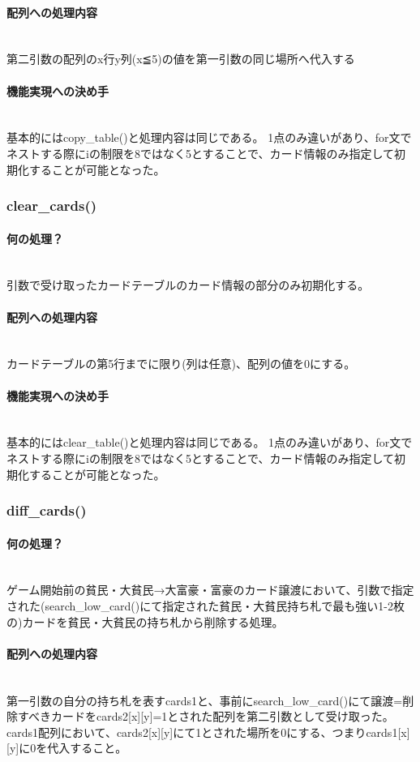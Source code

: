 \documentclass[11pt,a4paper, uplatex]{jsarticle}
\begin{document}
\paragraph{配列への処理内容}\mbox{}\\
第二引数の配列のx行y列(x≦5)の値を第一引数の同じ場所へ代入する
\paragraph{機能実現への決め手}\mbox{}\\
基本的にはcopy\_table()と処理内容は同じである。
1点のみ違いがあり、for文でネストする際にiの制限を8ではなく5とすることで、カード情報のみ指定して初期化することが可能となった。
%
\subsubsection{clear\_cards()}
\paragraph{何の処理？}\mbox{}\\
引数で受け取ったカードテーブルのカード情報の部分のみ初期化する。
\paragraph{配列への処理内容}\mbox{}\\
カードテーブルの第5行までに限り(列は任意)、配列の値を0にする。
\paragraph{機能実現への決め手}\mbox{}\\
基本的にはclear\_table()と処理内容は同じである。
1点のみ違いがあり、for文でネストする際にiの制限を8ではなく5とすることで、カード情報のみ指定して初期化することが可能となった。
%
\subsubsection{diff\_cards()}
\paragraph{何の処理？}\mbox{}\\
ゲーム開始前の貧民・大貧民→大富豪・富豪のカード譲渡において、引数で指定された(search\_low\_card()にて指定された貧民・大貧民持ち札で最も強い1-2枚の)カードを貧民・大貧民の持ち札から削除する処理。
\paragraph{配列への処理内容}\mbox{}\\
第一引数の自分の持ち札を表すcards1と、事前にsearch\_low\_card()にて譲渡=削除すべきカードをcards2[x][y]=1とされた配列を第二引数として受け取った。cards1配列において、cards2[x][y]にて1とされた場所を0にする、つまりcards1[x][y]に0を代入すること。
\end{document}
